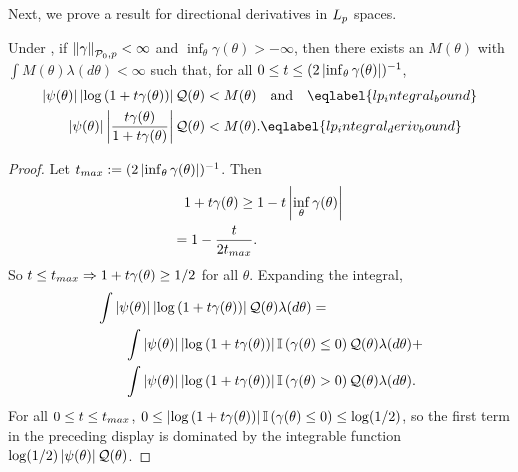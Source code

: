 Next, we prove a result for directional derivatives in ${L_{p}}$ spaces.


\begin{lem}
%
Under , if $\left\Vert\gamma\right\Vert_{\mathcal{P}_{0}, p} < \infty$
and $\inf_\theta \gamma(\theta) > -\infty$, then there
exists an $M(\theta)$ with $\int M(\theta) \lambda(d\theta) < \infty$
such that, for all $0 \le t \le (2 \left|\inf_\theta \gamma(\theta)\right|)^{-1}$,
%
\begin{align}
%
\abs{\psi(\theta)}\abs{\log\left(1 + \t \gamma(\theta)\right)}\q(\theta)
    <{}& M(\theta) \mathand \eqlabel{lp_integral_bound}\\
%
\abs{\psi(\theta)}\abs{\frac{\t \gamma(\theta)}{1 + \t \gamma(\theta)}}\q(\theta)
    <{}& M(\theta). \eqlabel{lp_integral_deriv_bound}
%
\end{align}
%
\begin{proof}

Let $t_{max} := (2 \left|\inf_\theta \gamma(\theta)\right|)^{-1}$.  Then
%
\begin{align*}
%
1 + \t \gamma(\theta) \ge{}& 1 - \t \abs{\inf_\theta \gamma(\theta)}
\\={}
    1 - \frac{\t}{2 \t_{max}}.
%
\end{align*}
%
So $t \le t_{max} \Rightarrow 1 + t \gamma(\theta) \ge 1/2$ for all $\theta$.
Expanding the integral,
%
\begin{align*}
%
\MoveEqLeft
\int \abs{\psi(\theta)}
    \abs{\log\left(1 + \t \gamma(\theta)\right)}\q(\theta)
    \lambda(d\theta) ={}
\\&
\int \abs{\psi(\theta)}
    \abs{\log\left(1 + \t \gamma(\theta)\right)}
    \ind{\gamma(\theta) \le 0}
    \q(\theta)\lambda(d\theta)  +
\\&
\int \abs{\psi(\theta)}
    \abs{\log\left(1 + \t \gamma(\theta)\right)}
    \ind{\gamma(\theta) > 0}
    \q(\theta)\lambda(d\theta).
%
\end{align*}
%
For all $0 \le t \le t_{max}$, $0 \le \left|\log\left(1 + t
\gamma(\theta)\right)\right| \mathbb{I}\left(\gamma(\theta) \le 0\right) \le \log(1/2)$,
so the first term in the preceding display is dominated by the integrable
function $\log(1/2) \left|\psi(\theta)\right|\mathcal{Q}(\theta)$.


\end{proof}
\end{lem}

